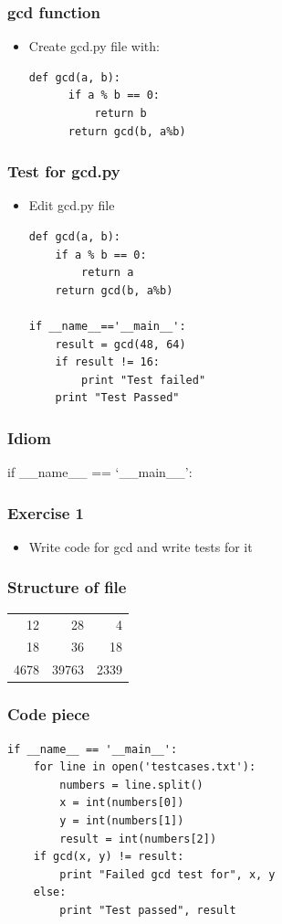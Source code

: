 \documentclass[presentation]{beamer}
\begin{document}
\begin{frame}[fragile]
\frametitle{gcd function}
\label{sec-4}


\begin{itemize}
\item Create gcd.py file with:
\lstset{language=Python}
\begin{lstlisting}
def gcd(a, b):
      if a % b == 0: 
          return b
      return gcd(b, a%b)
\end{lstlisting}
\end{itemize}
\end{frame}
\begin{frame}[fragile]
\frametitle{Test for gcd.py}
\label{sec-5}


\begin{itemize}
\item Edit gcd.py file
\lstset{language=Python}
\begin{lstlisting}
def gcd(a, b):
    if a % b == 0:
        return a
    return gcd(b, a%b)

if __name__=='__main__':
    result = gcd(48, 64)
    if result != 16:
        print "Test failed"
    print "Test Passed"
\end{lstlisting}
\end{itemize}
\end{frame}
\begin{frame}
\frametitle{Idiom}
\label{sec-6}

if \_\_name\_\_ == `\_\_main\_\_':
\end{frame}
\begin{frame}
\frametitle{Exercise 1}
\label{sec-7}


\begin{itemize}
\item Write code for gcd and write tests for it
\end{itemize}
\end{frame}
\begin{frame}
\frametitle{Structure of file}
\label{sec-8}


\begin{center}
\begin{tabular}{rrr}
   12  &     28  &     4  \\
   18  &     36  &    18  \\
 4678  &  39763  &  2339  \\
\end{tabular}
\end{center}
\end{frame}
\begin{frame}[fragile]
\frametitle{Code piece}
\label{sec-9}

\lstset{language=Python}
\begin{lstlisting}
if __name__ == '__main__':
    for line in open('testcases.txt'):
        numbers = line.split()
        x = int(numbers[0])
        y = int(numbers[1])
        result = int(numbers[2])
    if gcd(x, y) != result:
        print "Failed gcd test for", x, y
    else:
        print "Test passed", result
\end{lstlisting}
\end{frame}
\end{document}
